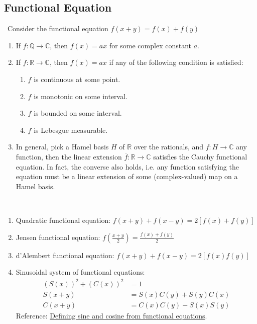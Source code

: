 \documentclass{treatise}
\begin{document}
\begin{shaded}
\section{Functional Equation}
\begin{proposition} \ 
Consider the functional equation $f(x + y) = f(x) + f(y)$
\begin{enumerate}
	\item If $f: \mathbb{Q} \to \mathbb{C}$, then $f(x) = ax$ for some complex constant $a$.
	\item If $f: \mathbb{R} \to \mathbb{C}$, then $f(x) = ax$ if any of the following condition is satisfied:
	\begin{enumerate}
		\item $f$ is continuous at some point.
		\item $f$ is monotonic on some interval.
		\item $f$ is bounded on some interval.
		\item $f$ is Lebesgue measurable.
	\end{enumerate}
	\item In general, pick a Hamel basis $H$ of $\mathbb{R}$ over the rationals, and $f: H \to \mathbb{C}$ any function, then the linear extension $\overline{f}: \mathbb{R} \to \mathbb{C}$ satisfies the Cauchy functional equation. In fact, the converse also holds, i.e. any function satisfying the equation must be a linear extension of some (complex-valued) map on a Hamel basis.
\end{enumerate}
\end{proposition}
\begin{proposition} \ 
\begin{enumerate}
	\item Quadratic functional equation: $f(x + y) + f(x - y) = 2[f(x) + f(y)]$
	\item Jensen functional equation: $f \left( \frac{x + y}{2} \right) = \frac{f(x) + f(y)}{2}$
	\item d'Alembert functional equation: $f(x + y) + f(x - y) = 2[f(x) f(y)]$
	\item Sinusoidal system of functional equations:
	\begin{align*}
	(S(x))^2 + (C(x))^2 & = 1
	\\
	S(x + y) & = S(x) C(y) + S(y) C(x)
	\\
	C(x + y) & = C(x) C(y) - S(x) S(y)
	\end{align*}
	Reference: \href{https://math.stackexchange.com/questions/3386066/defining-sine-and-cosine-from-functional-equations-sx2cx2-1-cxy}{Defining sine and cosine from functional equations}.
\end{enumerate}
\end{proposition}


\end{shaded}
\end{document}

